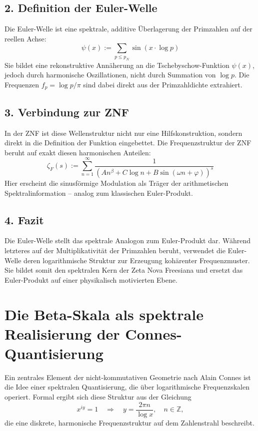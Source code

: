 \documentclass[a4paper,12pt]{article}
\begin{document}
\begin{center}
\subsection*{2. Definition der Euler-Welle}

Die Euler-Welle ist eine spektrale, additive Überlagerung der Primzahlen auf der reellen Achse:
\[
\psi(x) := \sum_{p \leq p_N} \sin(x \cdot \log p)
\]
Sie bildet eine rekonstruktive Annäherung an die Tschebyschow-Funktion \( \psi(x) \), jedoch durch harmonische Oszillationen, nicht durch Summation von \(\log p\). Die Frequenzen \( f_p = \log p / \pi \) sind dabei direkt aus der Primzahldichte extrahiert.

\subsection*{3. Verbindung zur ZNF}

In der ZNF ist diese Wellenstruktur nicht nur eine Hilfskonstruktion, sondern direkt in die Definition der Funktion eingebettet. Die Frequenzstruktur der ZNF beruht auf exakt diesen harmonischen Anteilen:
\[
\zeta_F(s) := \sum_{n=1}^\infty \frac{1}{(A n^{\beta} + C \log n + B \sin(\omega n + \varphi))^s}
\]
Hier erscheint die sinusförmige Modulation als Träger der arithmetischen Spektralinformation – analog zum klassischen Euler-Produkt.

\subsection*{4. Fazit}

Die Euler-Welle stellt das spektrale Analogon zum Euler-Produkt dar. Während letzteres auf der Multiplikativität der Primzahlen beruht, verwendet die Euler-Welle deren logarithmische Struktur zur Erzeugung kohärenter Frequenzmuster. Sie bildet somit den spektralen Kern der Zeta Nova Freesiana und ersetzt das Euler-Produkt auf einer physikalisch motivierten Ebene.

\section{Die Beta-Skala als spektrale Realisierung der Connes-Quantisierung}

Ein zentrales Element der nicht-kommutativen Geometrie nach Alain Connes ist die Idee einer spektralen Quantisierung, die über logarithmische Frequenzskalen operiert. Formal ergibt sich diese Struktur aus der Gleichung
\[
x^{iy} = 1 \quad \Rightarrow \quad y = \frac{2\pi n}{\log x}, \quad n \in \mathbb{Z},
\]
die eine diskrete, harmonische Frequenzstruktur auf dem Zahlenstrahl beschreibt.


\end{center}
\end{document}
